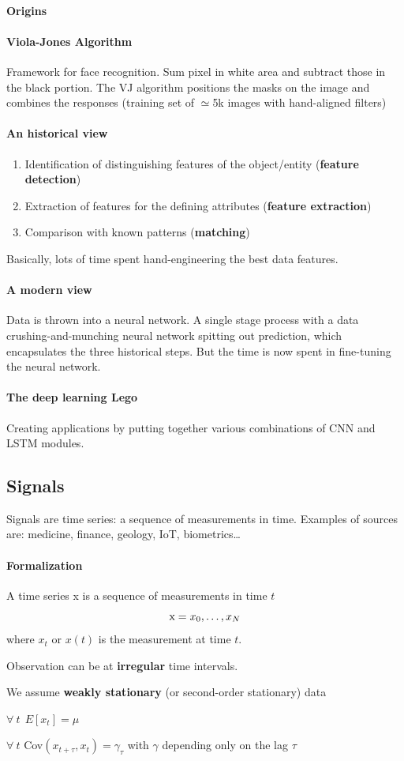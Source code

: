 \documentclass[10pt]{report}
\begin{document}
\paragraph{Origins} 
\paragraph{Viola-Jones Algorithm} Framework for face recognition. Sum pixel in white area and subtract those in the black portion. The VJ algorithm positions the masks on the image and combines the responses (training set of $\simeq$5k images with hand-aligned filters)
\paragraph{An historical view} \begin{enumerate}
	\item Identification of distinguishing features of the object/entity (\textbf{feature detection})
	\item Extraction of features for the defining attributes (\textbf{feature extraction})
	\item Comparison with known patterns (\textbf{matching})
\end{enumerate}
Basically, lots of time spent hand-engineering the best data features.
\paragraph{A modern view}
Data is thrown into a neural network. A single stage process with a data crushing-and-munching neural network spitting out prediction, which encapsulates the three historical steps. But the time is now spent in fine-tuning the neural network.
\paragraph{The deep learning Lego} Creating applications by putting together various combinations of CNN and LSTM modules.
\subsection{Signals}
Signals are time series: a sequence of measurements in time. Examples of sources are: medicine, finance, geology, IoT, biometrics\ldots
\paragraph{Formalization} A time series x is a sequence of measurements in time $t$
$$\hbox{x} = x_0,\ldots,x_N$$
where $x_t$ or $x(t)$ is the measurement at time $t$.
\begin{list}{}{}
	\item Observation can be at \textbf{irregular} time intervals.
	\item We assume \textbf{weakly stationary} (or second-order stationary) data\begin{list}{}{}
		\item $\forall\:t\:\:E[x_t] = \mu$
		\item $\forall\:t$ Cov$(x_{t+\tau},x_t) = \gamma_\tau$ with $\gamma$ depending only on the lag $\tau$
	\end{list}
\end{list}
\end{document}
